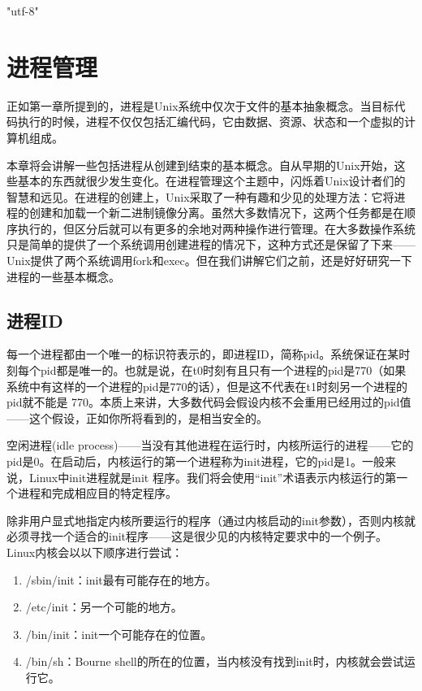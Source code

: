 \ifx\atempxetex\usewhat
\XeTeXinputencoding "utf-8"
\fi
{}

\chapter{进程管理}

正如第一章所提到的，进程是Unix系统中仅次于文件的基本抽象概念。当目标代码执行的时候，进程不仅仅包括汇编代码，它由数据、资源、状态和一个虚拟的计算机组成。

本章将会讲解一些包括进程从创建到结束的基本概念。自从早期的Unix开始，这些基本的东西就很少发生变化。在进程管理这个主题中，闪烁着Unix设计者们的智慧和远见。在进程的创建上，Unix采取了一种有趣和少见的处理方法：它将进程的创建和加载一个新二进制镜像分离。虽然大多数情况下，这两个任务都是在顺序执行的，但区分后就可以有更多的余地对两种操作进行管理。在大多数操作系统只是简单的提供了一个系统调用创建进程的情况下，这种方式还是保留了下来——Unix提供了两个系统调用fork和exec。但在我们讲解它们之前，还是好好研究一下进程的一些基本概念。

\section{进程ID}

每一个进程都由一个唯一的标识符表示的，即进程ID，简称pid。系统保证在某时刻每个pid都是唯一的。也就是说，在t0时刻有且只有一个进程的pid是770（如果系统中有这样的一个进程的pid是770的话），但是这不代表在t1时刻另一个进程的pid就不能是 770。本质上来讲，大多数代码会假设内核不会重用已经用过的pid值——这个假设，正如你所将看到的，是相当安全的。

空闲进程(idle process)——当没有其他进程在运行时，内核所运行的进程——它的pid是0。在启动后，内核运行的第一个进程称为init进程，它的pid是1。一般来说，Linux中init进程就是init 程序。我们将会使用“init”术语表示内核运行的第一个进程和完成相应目的特定程序。

除非用户显式地指定内核所要运行的程序（通过内核启动的init参数），否则内核就必须寻找一个适合的init程序——这是很少见的内核特定要求中的一个例子。Linux内核会以以下顺序进行尝试：

\begin{enumerate}
\item /sbin/init：init最有可能存在的地方。
\item /etc/init：另一个可能的地方。
\item /bin/init：init一个可能存在的位置。
\item /bin/sh：Bourne shell的所在的位置，当内核没有找到init时，内核就会尝试运行它。
\end{enumerate}

